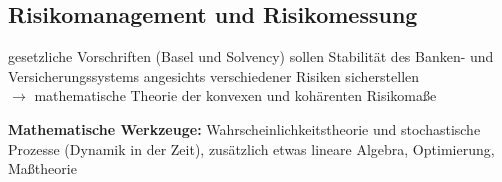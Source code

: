 \subsection{Risikomanagement und Risikomessung}

gesetzliche Vorschriften (Basel und Solvency) sollen Stabilität des Banken- und Versicherungssystems angesichts verschiedener Risiken sicherstellen \\
$\to$ mathematische Theorie der konvexen und kohärenten Risikomaße

\textbf{Mathematische Werkzeuge:} Wahrscheinlichkeitstheorie und stochastische Prozesse (Dynamik in der Zeit), zusätzlich etwas lineare Algebra, Optimierung, Maßtheorie